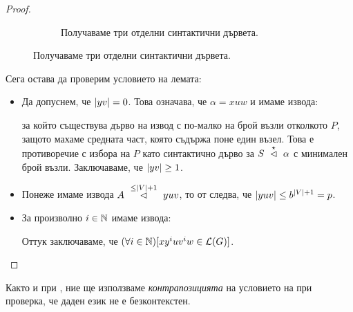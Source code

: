 \begin{proof}
\begin{figure}[H]
\begin{subfigure}[t]{0.3\textwidth}
      \caption{Получаваме три отделни синтактични дървета.}
    \end{subfigure}
  \end{figure}
  Сега остава да проверим условието на лемата:
  \begin{itemize}
  \item
    Да допуснем, че $\abs{yv} = 0$. Това означава, че $\alpha = xuw$ и имаме извода:
    \begin{prooftree}
    \end{prooftree}
    за който съществува дърво на извод с по-малко на брой възли отколкото $P$, защото махаме средната част, която съдържа поне един възел.
    Това е противоречие с избора на $P$ като синтактично дърво за $S \yield{\star}\alpha$ с минимален брой възли.
    Заключаваме, че $\abs{yv} \geq 1$.
  \item
    Понеже имаме извода $A \yield{\leq\abs{V}+1} yuv$, то от  следва, че $\abs{yuv} \leq b^{\abs{V}+1} = p$.
  \item
    За произволно $i\in\Nat$ имаме извода:
    \begin{prooftree}
    \end{prooftree}
    Оттук заключаваме, че $(\forall i \in \Nat)[xy^iuv^iw \in \L(G)]$.
  \end{itemize}
\end{proof}

Както и при , ние ще използваме \emph{контрапозицията} на условието на 
при проверка, че даден език не е безконтекстен.

